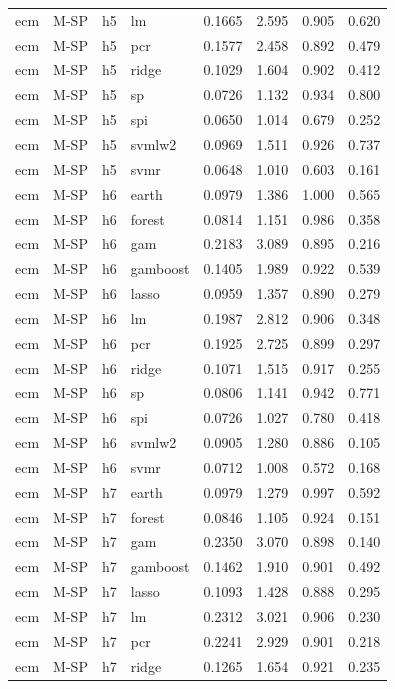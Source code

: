 \begin{ThreePartTable}
\begin{longtable}[t]{llclcccc}
ecm & M-SP & h5 & lm & 0.1665 & 2.595 & 0.905 & 0.620\\
ecm & M-SP & h5 & pcr & 0.1577 & 2.458 & 0.892 & 0.479\\
ecm & M-SP & h5 & ridge & 0.1029 & 1.604 & 0.902 & 0.412\\
ecm & M-SP & h5 & sp & 0.0726 & 1.132 & 0.934 & 0.800\\
ecm & M-SP & h5 & spi & 0.0650 & 1.014 & 0.679 & 0.252\\
ecm & M-SP & h5 & svmlw2 & 0.0969 & 1.511 & 0.926 & 0.737\\
ecm & M-SP & h5 & svmr & 0.0648 & 1.010 & 0.603 & 0.161\\
\addlinespace
ecm & M-SP & h6 & earth & 0.0979 & 1.386 & 1.000 & 0.565\\
ecm & M-SP & h6 & forest & 0.0814 & 1.151 & 0.986 & 0.358\\
ecm & M-SP & h6 & gam & 0.2183 & 3.089 & 0.895 & 0.216\\
ecm & M-SP & h6 & gamboost & 0.1405 & 1.989 & 0.922 & 0.539\\
ecm & M-SP & h6 & lasso & 0.0959 & 1.357 & 0.890 & 0.279\\
ecm & M-SP & h6 & lm & 0.1987 & 2.812 & 0.906 & 0.348\\
ecm & M-SP & h6 & pcr & 0.1925 & 2.725 & 0.899 & 0.297\\
ecm & M-SP & h6 & ridge & 0.1071 & 1.515 & 0.917 & 0.255\\
ecm & M-SP & h6 & sp & 0.0806 & 1.141 & 0.942 & 0.771\\
ecm & M-SP & h6 & spi & 0.0726 & 1.027 & 0.780 & 0.418\\
ecm & M-SP & h6 & svmlw2 & 0.0905 & 1.280 & 0.886 & 0.105\\
ecm & M-SP & h6 & svmr & 0.0712 & 1.008 & 0.572 & 0.168\\
\addlinespace
ecm & M-SP & h7 & earth & 0.0979 & 1.279 & 0.997 & 0.592\\
ecm & M-SP & h7 & forest & 0.0846 & 1.105 & 0.924 & 0.151\\
ecm & M-SP & h7 & gam & 0.2350 & 3.070 & 0.898 & 0.140\\
ecm & M-SP & h7 & gamboost & 0.1462 & 1.910 & 0.901 & 0.492\\
ecm & M-SP & h7 & lasso & 0.1093 & 1.428 & 0.888 & 0.295\\
ecm & M-SP & h7 & lm & 0.2312 & 3.021 & 0.906 & 0.230\\
ecm & M-SP & h7 & pcr & 0.2241 & 2.929 & 0.901 & 0.218\\
ecm & M-SP & h7 & ridge & 0.1265 & 1.654 & 0.921 & 0.235\\

\end{longtable}
\end{ThreePartTable}
